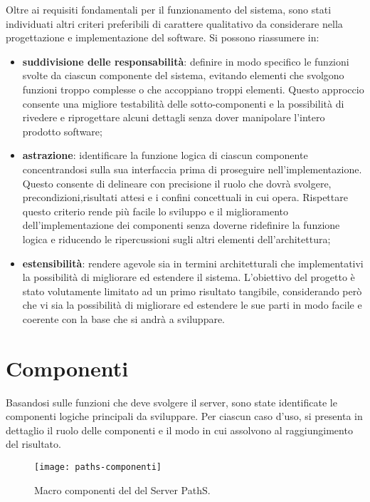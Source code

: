Oltre ai requisiti fondamentali per il funzionamento del sistema, sono stati individuati altri criteri preferibili di carattere qualitativo da considerare nella progettazione e implementazione del software. Si possono riassumere in:
\begin{itemize}
\item \textbf{suddivisione delle responsabilità}: definire in modo specifico le funzioni svolte da ciascun componente del sistema, evitando elementi che svolgono funzioni troppo complesse o che accoppiano troppi elementi. Questo approccio consente una migliore testabilità delle sotto-componenti e la possibilità di rivedere e riprogettare alcuni dettagli senza dover manipolare l'intero prodotto software;
\item \textbf{astrazione}: identificare la funzione logica di ciascun componente concentrandosi sulla sua interfaccia prima di proseguire nell'implementazione. Questo consente di delineare con precisione il ruolo che dovrà svolgere, precondizioni,risultati attesi e i confini concettuali in cui opera. Rispettare questo criterio rende più facile lo sviluppo e il miglioramento dell'implementazione dei componenti senza doverne ridefinire la funzione logica e riducendo le ripercussioni sugli altri elementi dell'architettura;
\item \textbf{estensibilità}: rendere agevole sia in termini architetturali che implementativi la possibilità di migliorare ed estendere il sistema. L'obiettivo del progetto è stato volutamente limitato ad un primo risultato tangibile, considerando però che vi sia la possibilità di migliorare ed estendere le sue parti in modo facile e coerente con la base che si andrà a sviluppare.
\end{itemize}

\section{Componenti}
Basandosi sulle funzioni che deve svolgere il server, sono state identificate le componenti logiche principali da sviluppare. Per ciascun caso d'uso, si presenta in dettaglio il ruolo delle componenti e il modo in cui assolvono al raggiungimento del risultato.

\begin{figure}[ht]
  \centering
  \texttt{[image: paths-componenti]}
  \caption{\footnotesize{Macro componenti del del Server PathS.}}
  \label{fig:paths-componenti}
\end{figure}

